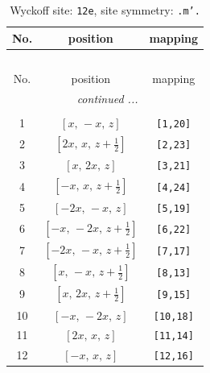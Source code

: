 \documentclass[fleqn,8pt]{jsarticle}
\begin{document}
\begin{longtable}{ccc}
\caption{Wyckoff site: {\tt 12e}, site symmetry: {\tt .m'.}}
 \\
 \hline \hline
No. & position & mapping \\ \hline \endfirsthead

\multicolumn{2}{l}{\tablename\ \thetable{}} \\
 \hline \hline
No. & position & mapping \\ \hline \endhead

 \hline \hline
\multicolumn{2}{r}{\footnotesize\it continued ...} \\ \endfoot

 \hline \hline
\multicolumn{2}{r}{} \\ \endlastfoot

1 & $\left[ x,\, - x,\, z \right]$ & {\tt [1,20]} \\ \hline
2 & $\left[ 2 x,\, x,\, z + \frac{1}{2} \right]$ & {\tt [2,23]} \\ \hline
3 & $\left[ x,\, 2 x,\, z \right]$ & {\tt [3,21]} \\ \hline
4 & $\left[ - x,\, x,\, z + \frac{1}{2} \right]$ & {\tt [4,24]} \\ \hline
5 & $\left[ - 2 x,\, - x,\, z \right]$ & {\tt [5,19]} \\ \hline
6 & $\left[ - x,\, - 2 x,\, z + \frac{1}{2} \right]$ & {\tt [6,22]} \\ \hline
7 & $\left[ - 2 x,\, - x,\, z + \frac{1}{2} \right]$ & {\tt [7,17]} \\ \hline
8 & $\left[ x,\, - x,\, z + \frac{1}{2} \right]$ & {\tt [8,13]} \\ \hline
9 & $\left[ x,\, 2 x,\, z + \frac{1}{2} \right]$ & {\tt [9,15]} \\ \hline
10 & $\left[ - x,\, - 2 x,\, z \right]$ & {\tt [10,18]} \\ \hline
11 & $\left[ 2 x,\, x,\, z \right]$ & {\tt [11,14]} \\ \hline
12 & $\left[ - x,\, x,\, z \right]$ & {\tt [12,16]} \\
\end{longtable}
\renewcommand{\arraystretch}{1.2}
\end{document}
